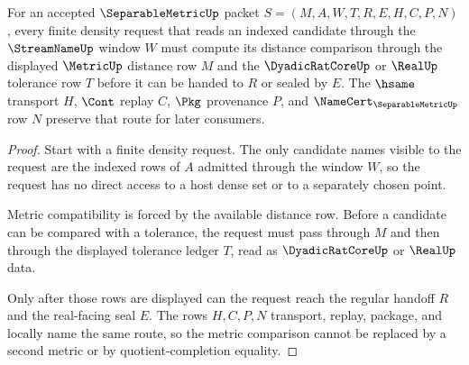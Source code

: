 \begin{theorem}
\label{thm:separablemetric-dense-window-metric-compatibility}
For an accepted $\SeparableMetricUp$ packet $S=(M,A,W,T,R,E,H,C,P,N)$, every finite density request that reads an indexed candidate through the $\StreamNameUp$ window $W$ must compute its distance comparison through the displayed $\MetricUp$ distance row $M$ and the $\DyadicRatCoreUp$ or $\RealUp$ tolerance row $T$ before it can be handed to $R$ or sealed by $E$. The $\hsame$ transport $H$, $\Cont$ replay $C$, $\Pkg$ provenance $P$, and $\NameCert_{\SeparableMetricUp}$ row $N$ preserve that route for later consumers.
\end{theorem}
\begin{proof}
Start with a finite density request. The only candidate names visible to the request are the indexed rows of $A$ admitted through the window $W$, so the request has no direct access to a host dense set or to a separately chosen point.

Metric compatibility is forced by the available distance row. Before a candidate can be compared with a tolerance, the request must pass through $M$ and then through the displayed tolerance ledger $T$, read as $\DyadicRatCoreUp$ or $\RealUp$ data.

Only after those rows are displayed can the request reach the regular handoff $R$ and the real-facing seal $E$. The rows $H,C,P,N$ transport, replay, package, and locally name the same route, so the metric comparison cannot be replaced by a second metric or by quotient-completion equality.
\end{proof}

